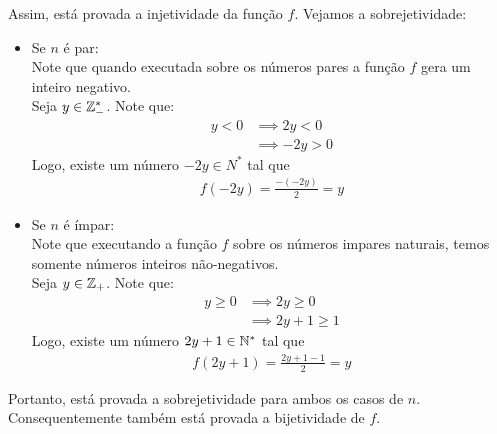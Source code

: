 Assim, está provada a injetividade da função $f$. Vejamos a sobrejetividade:
\begin{itemize}
    \item Se $n$ é par: \\
    Note que quando executada sobre os números pares a função $f$ gera um inteiro negativo. \\
    Seja $y \in \mathbb Z_-^*$. Note que:
    \begin{align*}
        y < 0 & \implies 2y < 0 \\ & \implies
        -2y > 0
    \end{align*}
    Logo, existe um número $-2y \in N^*$ tal que
    \begin{align*}
        f(-2y) = \frac{-(-2y)}{2} = y
    \end{align*}
    \item Se $n$ é ímpar: \\
    Note que executando a função $f$ sobre os números impares naturais, temos somente números inteiros não-negativos. \\
    Seja $y \in \mathbb Z_+$. Note que:
    \begin{align*}
        y \ge 0 & \implies 2y \ge 0 \\ & \implies
        2y + 1 \ge 1
    \end{align*}
    Logo, existe um número $2y + 1 \in \mathbb N^*$ tal que
    \begin{align*}
        f(2y + 1) = \frac{2y + 1 - 1}{2} = y
    \end{align*}
\end{itemize}
Portanto, está provada a sobrejetividade para ambos os casos de $n$. Consequentemente também está provada a bijetividade de $f$.